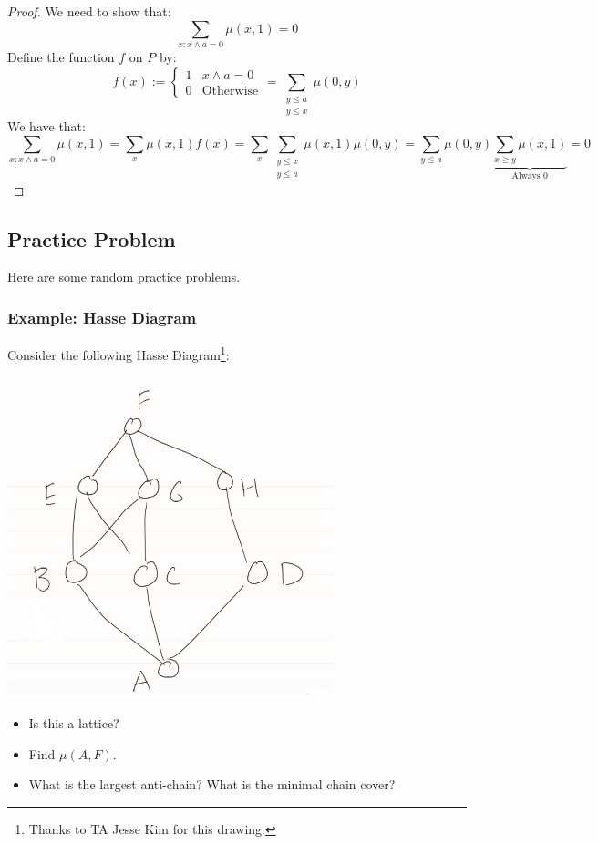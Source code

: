 \documentclass[letterpaper]{article}
\begin{document}
\begin{proof}
    We need to show that:
    \[\sum_{x: x \wedge a = 0} \mu(x, 1) = 0\]
    Define the function $f$ on $P$ by:
    \[f(x) := \begin{cases}
        1 & x \wedge a = 0 \\ 
        0 & \text{Otherwise}
    \end{cases} = \sum_{\substack{y \leq a \\ y \leq x}} \mu(0, y)\]
    We have that:
    \[\sum_{x: x \wedge a = 0} \mu(x, 1) = \sum_x \mu(x, 1)f(x) = \sum_x \sum_{\substack{y \leq x \\ y \leq a}} \mu(x, 1) \mu(0, y) = \sum_{y \leq a} \mu(0, y) \underbrace{\sum_{x \geq y} \mu(x, 1)}_{\text{Always } 0} = 0\]
\end{proof}

\subsection{Practice Problem}
Here are some random practice problems. 

\subsubsection{Example: Hasse Diagram}
Consider the following Hasse Diagram\footnote{Thanks to TA Jesse Kim for this drawing.}:
\begin{center}
    \includegraphics[scale=0.6]{mobius.PNG}
\end{center}
\begin{itemize}
    \item Is this a lattice? 
    \item Find $\mu(A, F)$. 
    \item What is the largest anti-chain? What is the minimal chain cover? 
\end{itemize}
\end{document}
